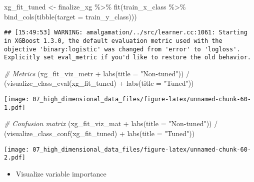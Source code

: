 \documentclass[
]{book}
\newenvironment{Shaded}{\begin{snugshade}}{\end{snugshade}}
\newcommand{\AttributeTok}[1]{\textcolor[rgb]{0.77,0.63,0.00}{#1}}
\newcommand{\CommentTok}[1]{\textcolor[rgb]{0.56,0.35,0.01}{\textit{#1}}}
\newcommand{\FunctionTok}[1]{\textcolor[rgb]{0.00,0.00,0.00}{#1}}
\newcommand{\NormalTok}[1]{#1}
\newcommand{\OtherTok}[1]{\textcolor[rgb]{0.56,0.35,0.01}{#1}}
\newcommand{\SpecialCharTok}[1]{\textcolor[rgb]{0.00,0.00,0.00}{#1}}
\newcommand{\StringTok}[1]{\textcolor[rgb]{0.31,0.60,0.02}{#1}}
\providecommand{\tightlist}{%
  \setlength{\itemsep}{0pt}\setlength{\parskip}{0pt}}
\begin{document}
\begin{Shaded}
\begin{Highlighting}[]
\NormalTok{xg\_fit\_tuned }\OtherTok{\textless{}{-}}\NormalTok{ finalize\_xg }\SpecialCharTok{\%\textgreater{}\%} 
  \FunctionTok{fit}\NormalTok{(train\_x\_class }\SpecialCharTok{\%\textgreater{}\%} \FunctionTok{bind\_cols}\NormalTok{(}\FunctionTok{tibble}\NormalTok{(}\AttributeTok{target =}\NormalTok{ train\_y\_class)))}
\end{Highlighting}
\end{Shaded}

\begin{verbatim}
## [15:49:53] WARNING: amalgamation/../src/learner.cc:1061: Starting in XGBoost 1.3.0, the default evaluation metric used with the objective 'binary:logistic' was changed from 'error' to 'logloss'. Explicitly set eval_metric if you'd like to restore the old behavior.
\end{verbatim}

\begin{Shaded}
\begin{Highlighting}[]
\CommentTok{\# Metrics }
\NormalTok{(xg\_fit\_viz\_metr }\SpecialCharTok{+} \FunctionTok{labs}\NormalTok{(}\AttributeTok{title =} \StringTok{"Non{-}tuned"}\NormalTok{)) }\SpecialCharTok{/}\NormalTok{ (}\FunctionTok{visualize\_class\_eval}\NormalTok{(xg\_fit\_tuned) }\SpecialCharTok{+} \FunctionTok{labs}\NormalTok{(}\AttributeTok{title =} \StringTok{"Tuned"}\NormalTok{))}
\end{Highlighting}
\end{Shaded}

\texttt{[image: 07\_high\_dimensional\_data\_files/figure-latex/unnamed-chunk-60-1.pdf]}

\begin{Shaded}
\begin{Highlighting}[]
\CommentTok{\# Confusion matrix }
\NormalTok{(xg\_fit\_viz\_mat }\SpecialCharTok{+} \FunctionTok{labs}\NormalTok{(}\AttributeTok{title =} \StringTok{"Non{-}tuned"}\NormalTok{)) }\SpecialCharTok{/}\NormalTok{ (}\FunctionTok{visualize\_class\_conf}\NormalTok{(xg\_fit\_tuned) }\SpecialCharTok{+} \FunctionTok{labs}\NormalTok{(}\AttributeTok{title =} \StringTok{"Tuned"}\NormalTok{))}
\end{Highlighting}
\end{Shaded}

\texttt{[image: 07\_high\_dimensional\_data\_files/figure-latex/unnamed-chunk-60-2.pdf]}

\begin{itemize}
\tightlist
\item
  Visualize variable importance
\end{itemize}
\end{document}

